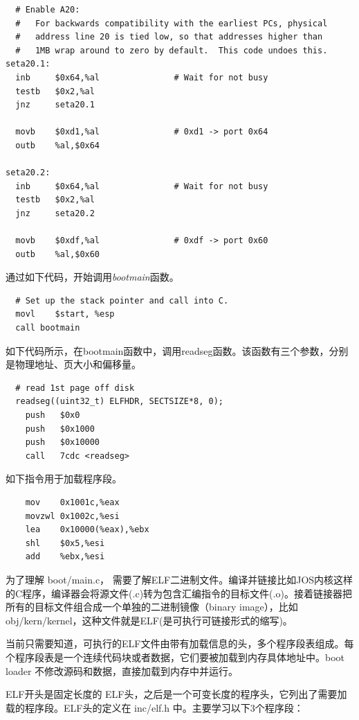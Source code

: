 \begin{ExerciseList}
\begin{verbatim}
  # Enable A20:
  #   For backwards compatibility with the earliest PCs, physical
  #   address line 20 is tied low, so that addresses higher than
  #   1MB wrap around to zero by default.  This code undoes this.
seta20.1:
  inb     $0x64,%al               # Wait for not busy
  testb   $0x2,%al
  jnz     seta20.1

  movb    $0xd1,%al               # 0xd1 -> port 0x64
  outb    %al,$0x64

seta20.2:
  inb     $0x64,%al               # Wait for not busy
  testb   $0x2,%al
  jnz     seta20.2

  movb    $0xdf,%al               # 0xdf -> port 0x60
  outb    %al,$0x60
\end{verbatim}

通过如下代码，开始调用\emph{bootmain}函数。

\begin{verbatim}
  # Set up the stack pointer and call into C.
  movl    $start, %esp
  call bootmain
\end{verbatim}

如下代码所示，在bootmain函数中，调用readseg函数。该函数有三个参数，分别是物理地址、页大小和偏移量。

\begin{verbatim}
  # read 1st page off disk
  readseg((uint32_t) ELFHDR, SECTSIZE*8, 0);
    push   $0x0
    push   $0x1000
    push   $0x10000
    call   7cdc <readseg>
\end{verbatim}

如下指令用于加载程序段。

\begin{verbatim}
    mov    0x1001c,%eax
    movzwl 0x1002c,%esi
    lea    0x10000(%eax),%ebx
    shl    $0x5,%esi
    add    %ebx,%esi
\end{verbatim}


为了理解 boot/main.c， 需要了解ELF二进制文件。编译并链接比如JOS内核这样的C程序，编译器会将源文件(.c)转为包含汇编指令的目标文件(.o)。接着链接器把所有的目标文件组合成一个单独的二进制镜像（binary image），比如 obj/kern/kernel，这种文件就是ELF(是可执行可链接形式的缩写)。

当前只需要知道，可执行的ELF文件由带有加载信息的头，多个程序段表组成。每个程序段表是一个连续代码块或者数据，它们要被加载到内存具体地址中。boot loader 不修改源码和数据，直接加载到内存中并运行。

ELF开头是固定长度的 ELF头，之后是一个可变长度的程序头，它列出了需要加载的程序段。ELF头的定义在 inc/elf.h 中。主要学习以下3个程序段：


\end{ExerciseList}
